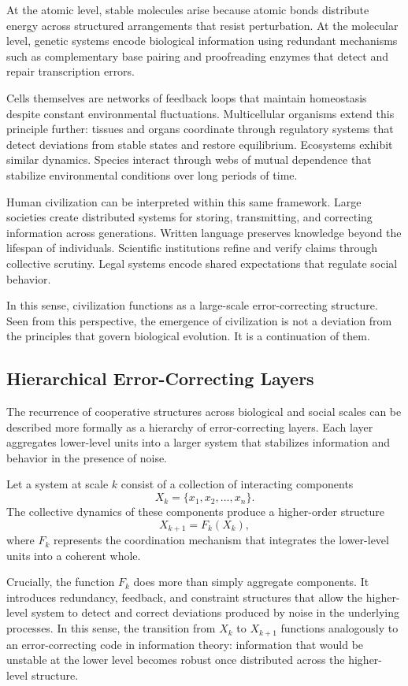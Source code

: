 \documentclass[12pt]{article}
\begin{document}
At the atomic level, stable molecules arise because atomic bonds distribute energy across structured arrangements that resist perturbation. At the molecular level, genetic systems encode biological information using redundant mechanisms such as complementary base pairing and proofreading enzymes that detect and repair transcription errors.

Cells themselves are networks of feedback loops that maintain homeostasis despite constant environmental fluctuations. Multicellular organisms extend this principle further: tissues and organs coordinate through regulatory systems that detect deviations from stable states and restore equilibrium. Ecosystems exhibit similar dynamics. Species interact through webs of mutual dependence that stabilize environmental conditions over long periods of time.

Human civilization can be interpreted within this same framework. Large societies create distributed systems for storing, transmitting, and correcting information across generations. Written language preserves knowledge beyond the lifespan of individuals. Scientific institutions refine and verify claims through collective scrutiny. Legal systems encode shared expectations that regulate social behavior.

In this sense, civilization functions as a large-scale error-correcting structure. Seen from this perspective, the emergence of civilization is not a deviation from the principles that govern biological evolution. It is a continuation of them.

\subsection{Hierarchical Error-Correcting Layers}

The recurrence of cooperative structures across biological and social scales can be described more formally as a hierarchy of error-correcting layers. Each layer aggregates lower-level units into a larger system that stabilizes information and behavior in the presence of noise.

Let a system at scale $k$ consist of a collection of interacting components
\[
X_k = \{x_1, x_2, \dots, x_n\}.
\]
The collective dynamics of these components produce a higher-order structure
\[
X_{k+1} = F_k(X_k),
\]
where $F_k$ represents the coordination mechanism that integrates the lower-level units into a coherent whole.

Crucially, the function $F_k$ does more than simply aggregate components. It introduces redundancy, feedback, and constraint structures that allow the higher-level system to detect and correct deviations produced by noise in the underlying processes. In this sense, the transition from $X_k$ to $X_{k+1}$ functions analogously to an error-correcting code in information theory: information that would be unstable at the lower level becomes robust once distributed across the higher-level structure.
\end{document}
